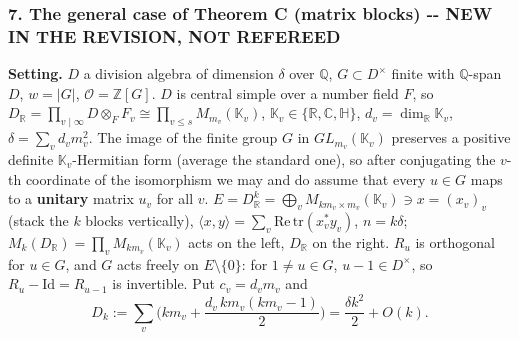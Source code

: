 \hypertarget{the-general-case-of-theorem-c-matrix-blocks----new-in-the-revision-not-refereed}{%
\subsubsection*{7. The general case of Theorem C (matrix blocks) -\/- NEW IN THE REVISION, NOT REFEREED}\label{the-general-case-of-theorem-c-matrix-blocks----new-in-the-revision-not-refereed}}

\textbf{Setting.} \(D\) a division algebra of dimension \(\delta\) over \(\mathbb Q\), \(G\subset D^\times\) finite with \(\mathbb Q\)-span \(D\), \(w=|G|\), \(\mathcal O=\mathbb Z[G]\). \(D\) is central simple over a number field \(F\), so \(D_\mathbb R=\prod_{v\mid\infty}D\otimes_FF_v\cong\prod_{v\le s}M_{m_v}(\mathbb K_v)\), \(\mathbb K_v\in\{\mathbb R,\mathbb C,\mathbb H\}\), \(d_v=\dim_\mathbb R\mathbb K_v\), \(\delta=\sum_vd_vm_v^2\). The image of the finite group \(G\) in \(GL_{m_v}(\mathbb K_v)\) preserves a positive definite \(\mathbb K_v\)-Hermitian form (average the standard one), so after conjugating the \(v\)-th coordinate of the isomorphism we may and do assume that every \(u\in G\) maps to a \textbf{unitary} matrix \(u_v\) for all \(v\). \(E=D_\mathbb R^k=\bigoplus_vM_{km_v\times m_v}(\mathbb K_v)\ni x=(x_v)_v\) (stack the \(k\) blocks vertically), \(\langle x,y\rangle=\sum_v\mathrm{Re\,tr}(x_v^*y_v)\), \(n=k\delta\); \(M_k(D_\mathbb R)=\prod_vM_{km_v}(\mathbb K_v)\) acts on the left, \(D_\mathbb R\) on the right. \(R_u\) is orthogonal for \(u\in G\), and \(G\) acts freely on \(E\setminus\{0\}\): for \(1\ne u\in G\), \(u-1\in D^\times\), so \(R_u-\mathrm{Id}=R_{u-1}\) is invertible. Put \(c_v=d_vm_v\) and
\[D_k:=\sum_v\Big(km_v+\frac{d_v\,km_v(km_v-1)}2\Big)=\frac{\delta k^2}2+O(k).\]

